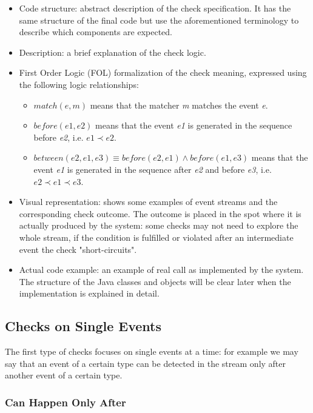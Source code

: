 \documentclass[11pt,a4paper,notitlepage]{article}
\begin{document}
\begin{itemize}
	\item Code structure: abstract description of the check specification. It has the same structure of the final code but use the aforementioned terminology to describe which components are expected.
	\item Description: a brief explanation of the check logic.
	\item First Order Logic (FOL) formalization of the check meaning, expressed using the following logic relationships:
	\begin{itemize}
		\item $match(e, m)$ means that the matcher \textit{m} matches the event \textit{e}.
		\item $before(e1, e2)$ means that the event \textit{e1} is generated in the sequence before \textit{e2}, i.e. $e1 \prec e2$.
		\item $between(e2, e1, e3) \equiv before(e2, e1) \land before(e1, e3)$ means that the event \textit{e1} is generated in the sequence after \textit{e2} and before \textit{e3}, i.e. $e2 \prec e1 \prec e3$.
	\end{itemize}
	\item Visual representation: shows some examples of event streams and the corresponding check outcome. The outcome is placed in the spot where it is actually produced by the system: some checks may not need to explore the whole stream, if the condition is fulfilled or violated after an intermediate event the check "short-circuits".
	\item Actual code example: an example of real call as implemented by the system. The structure of the Java classes and objects will be clear later when the implementation is explained in detail.
\end{itemize}


\subsection{Checks on Single Events}

The first type of checks focuses on single events at a time: for example we may say that an event of a certain type can be detected in the stream only after another event of a certain type.

\subsubsection{Can Happen Only After}
\end{document}
